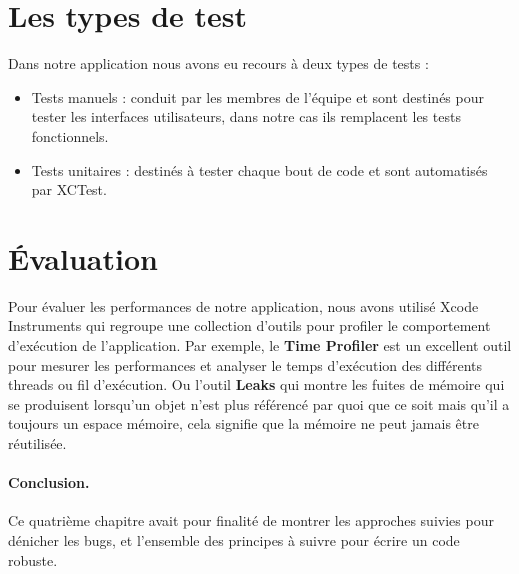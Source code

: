 \section{Les types de test} %
\label{sub:tests}
Dans notre application nous avons eu recours à deux types de tests :
\begin{itemize}
	\item Tests manuels : conduit par les membres de l'équipe et sont destinés pour tester les interfaces utilisateurs, dans notre cas ils remplacent les tests fonctionnels.
	\item Tests unitaires : destinés à tester chaque bout de code et sont automatisés par XCTest.
\end{itemize}

\section{Évaluation} %
Pour évaluer les performances de notre application, nous avons utilisé Xcode Instruments qui regroupe une collection d'outils pour profiler le comportement d'exécution de l’application. Par exemple, le \textbf{Time Profiler} est un excellent outil pour mesurer les performances et analyser le temps d'exécution des différents threads ou fil d’exécution. Ou l'outil \textbf{Leaks} qui montre les fuites de mémoire qui se produisent lorsqu'un objet n'est plus référencé par quoi que ce soit mais qu'il a toujours un espace mémoire, cela signifie que la mémoire ne peut jamais être réutilisée.\clearpage
{}

\paragraph{Conclusion.} %
\label{par:conclusion}
Ce quatrième chapitre avait pour finalité de montrer les approches suivies pour dénicher les bugs, et l'ensemble des principes à suivre pour écrire un code robuste.\cite{tdd}
